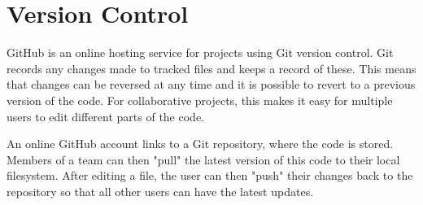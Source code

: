 \section{Version Control}

GitHub is an online hosting service for projects using Git version control. Git records any changes made to tracked files and keeps a record of these. This means that changes can be reversed at any time and it is possible to revert to a previous version of the code. For collaborative projects, this makes it easy for multiple users to edit different parts of the code. 

An online GitHub account links to a Git repository, where the code is stored. Members of a team can then "pull" the latest version of this code to their local filesystem. After editing a file, the user can then "push" their changes back to the repository so that all other users can have the latest updates. 


